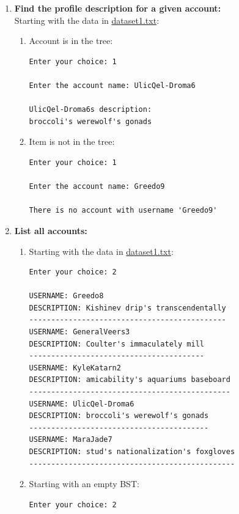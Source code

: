 \documentclass{assignment}
\begin{document}
\begin{enumerate}
    \item {\textbf{Find the profile description for a given account:} \\ Starting with the data in \underline{dataset1.txt}: 
    \begin{enumerate}
        \item Account is in the tree:
            \begin{center}
\small {
\color{gray}
\begin{BVerbatim}
Enter your choice: 1

Enter the account name: UlicQel-Droma6

UlicQel-Droma6s description:
broccoli's werewolf's gonads
\end{BVerbatim} 
}
\end{center} \color{black}

        \item Item is not in the tree:
            \begin{center}
\small {
\color{gray}
\begin{BVerbatim}
Enter your choice: 1

Enter the account name: Greedo9

There is no account with username 'Greedo9'
\end{BVerbatim} 
}
\end{center} \color{black}

    \end{enumerate}
}
    \newpage
\item \textbf{List all accounts:} 
    \begin{enumerate}
        \item Starting with the data in \underline{dataset1.txt}: 
            \begin{center}
\small {
\color{gray}
\begin{BVerbatim}
Enter your choice: 2

USERNAME: Greedo8
DESCRIPTION: Kishinev drip's transcendentally
---------------------------------------------
USERNAME: GeneralVeers3
DESCRIPTION: Coulter's immaculately mill
----------------------------------------
USERNAME: KyleKatarn2
DESCRIPTION: amicability's aquariums baseboard
----------------------------------------------
USERNAME: UlicQel-Droma6
DESCRIPTION: broccoli's werewolf's gonads
-----------------------------------------
USERNAME: MaraJade7
DESCRIPTION: stud's nationalization's foxgloves
-----------------------------------------------
\end{BVerbatim} 
}
\end{center} \color{black}
        \item Starting with an empty BST:
            \begin{center}
\small {
\color{gray}
\begin{BVerbatim}
Enter your choice: 2


\end{BVerbatim}}
\end{center}
\end{enumerate}
\end{enumerate}
\end{document}
